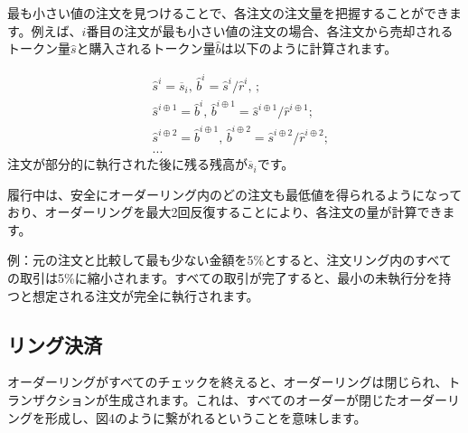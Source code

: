 \documentclass{article}
\makeatletter
\newenvironment{figurehere}
 {\def\@captype{figure}}
 {}
\makeatother
\begin{document}
\begin{multicols}{2}
最も小さい値の注文を見つけることで、各注文の注文量を把握することができます。例えば、$i$番目の注文が最も小さい値の注文の場合、各注文から売却されるトークン量$\hat{s}$と購入されるトークン量$\hat{b}$は以下のように計算されます。


\[
\begin{split}
&\hat{s}^{i}=\overline{s}_i\text{, } \hat{b}^{i}=\hat{s}^{i}/ \hat{r}^i\text{, }\text{;}\\
&\hat{s}^{i\oplus 1}=\hat{b}^i\text{, } \hat{b}^{i\oplus 1}=\hat{s}^{i\oplus 1}/ \hat{r}^{i\oplus 1}\text{;}\\
&\hat{s}^{i\oplus 2}=\hat{b}^{i\oplus 1}\text{, } \hat{b}^{i\oplus 2}=\hat{s}^{i\oplus 2}/ \hat{r}^{i\oplus 2}\text{;}\\
& ...
\end{split}
\]
注文が部分的に執行された後に残る残高が$\overline{s}_i$です。

履行中は、安全にオーダーリング内のどの注文も最低値を得られるようになっており、オーダーリングを最大2回反復することにより、各注文の量が計算できます。

例：元の注文と比較して最も少ない金額を5\%とすると、注文リング内のすべての取引は5\%に縮小されます。すべての取引が完了すると、最小の未執行分を持つと想定される注文が完全に執行されます。

\subsection{リング決済\label{sec:settlement}}

オーダーリングがすべてのチェックを終えると、オーダーリングは閉じられ、トランザクションが生成されます。これは、すべてのオーダーが閉じたオーダーリングを形成し、図4のように繋がれるということを意味します。

\begin{center}
\begin{figurehere}
\centering
{}
\end{figurehere}
\end{center}
\end{multicols}
\end{document}
